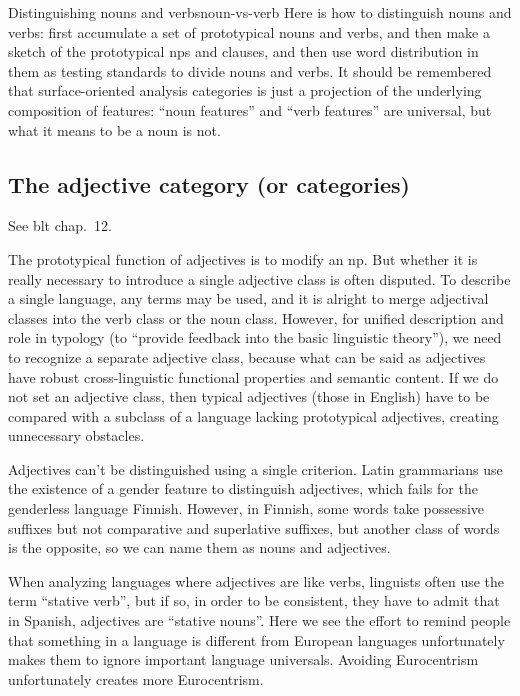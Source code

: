 \documentclass[UTF8, a4paper, oneside, scheme=plain]{ctexart}
\newcommand*{\citechap}[1]{chap.~{#1}}
\begin{document}
\begin{infobox}{Distinguishing nouns and verbs}{noun-vs-verb}
    Here is how to distinguish nouns and verbs:
    first accumulate a set of prototypical nouns and verbs,
    and then make a sketch of the prototypical \ac{np}s and clauses,
    and then use word distribution in them as testing standards to 
    divide nouns and verbs.
    It should be remembered that surface-oriented analysis categories 
    is just a projection of the underlying composition of features:
    ``noun features'' and ``verb features'' are universal,
    but what it means to be a noun is not.
\end{infobox}

\subsection{The adjective category (or categories)}

See \ac{blt} \citechap{12}. 

The prototypical function of adjectives is to modify an \ac{np}. 
But whether it is really necessary to introduce a single adjective class is often disputed. 
To describe a single language, any terms may be used, 
and it is alright to merge adjectival classes into the verb class or the noun class. 
However, for unified description and role in typology 
(to ``provide feedback into the basic linguistic theory''), 
we need to recognize a separate adjective class, 
because what can be said as adjectives have robust cross-linguistic functional properties and semantic content. 
If we do not set an adjective class, 
then typical adjectives (those in English) 
have to be compared with a subclass of a language lacking prototypical adjectives, 
creating unnecessary obstacles.

Adjectives can't be distinguished using a single criterion. 
Latin grammarians use the existence of a gender feature to distinguish adjectives, 
which fails for the genderless language Finnish. 
However, in Finnish, some words take possessive suffixes but not comparative and superlative suffixes, 
but another class of words is the opposite, so we can name them as nouns and adjectives.

When analyzing languages where adjectives are like verbs, 
linguists often use the term ``stative verb'', 
but if so, in order to be consistent, they have to admit that in Spanish, 
adjectives are ``stative nouns''. 
Here we see the effort to remind people that something in a language is different from European languages
unfortunately makes them to ignore important language universals.
Avoiding Eurocentrism unfortunately creates more Eurocentrism.
\end{document}
